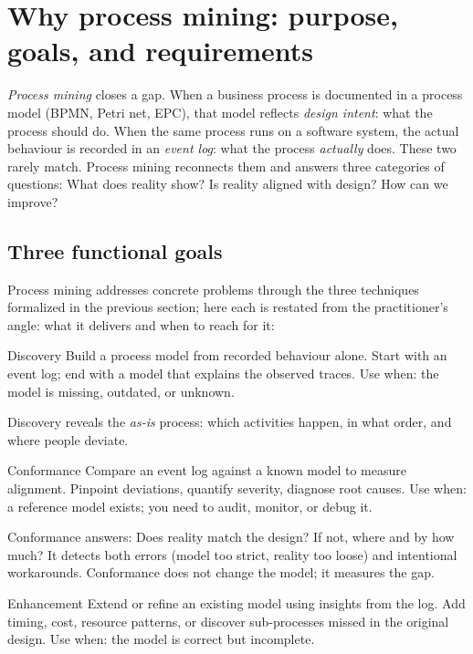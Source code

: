 \section{Why process mining: purpose, goals, and requirements}

\emph{Process mining} closes a gap. When a business process is documented in a process model (BPMN, Petri net, EPC), that model reflects \emph{design intent}: what the process should do. When the same process runs on a software system, the actual behaviour is recorded in an \emph{event log}: what the process \emph{actually} does. These two rarely match. Process mining reconnects them and answers three categories of questions: What does reality show? Is reality aligned with design? How can we improve?

\subsection{Three functional goals}

Process mining addresses concrete problems through the three techniques formalized in the previous section; here each is restated from the practitioner's angle: what it delivers and when to reach for it:

\begin{definitionbox}{Discovery}
Build a process model from recorded behaviour alone. Start with an event log; end with a model that explains the observed traces. Use when: the model is missing, outdated, or unknown.
\end{definitionbox}

Discovery reveals the \emph{as-is} process: which activities happen, in what order, and where people deviate.

\begin{definitionbox}{Conformance}
Compare an event log against a known model to measure alignment. Pinpoint deviations, quantify severity, diagnose root causes. Use when: a reference model exists; you need to audit, monitor, or debug it.
\end{definitionbox}

Conformance answers: Does reality match the design? If not, where and by how much? It detects both errors (model too strict, reality too loose) and intentional workarounds. Conformance does not change the model; it measures the gap.

\begin{definitionbox}{Enhancement}
Extend or refine an existing model using insights from the log. Add timing, cost, resource patterns, or discover sub-processes missed in the original design. Use when: the model is correct but incomplete.
\end{definitionbox}


